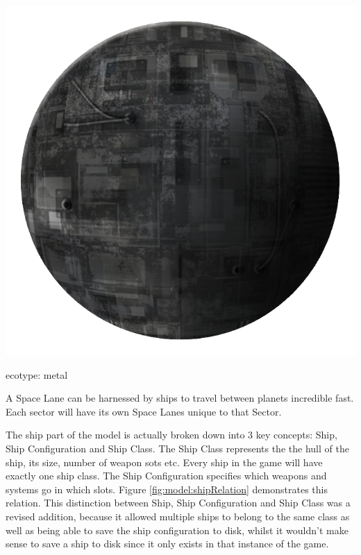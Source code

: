 \begin{marginfigure}
	\includegraphics{res/planets/metal-planet.png}
	\caption{ecotype: metal}
	\label{fig:model:metalPlanet}
\end{marginfigure}


A Space Lane can be harnessed by ships to travel between planets incredible fast.
Each sector will have its own Space Lanes unique to that Sector.

The ship part of the model is actually broken down into 3 key concepts: Ship, Ship Configuration and Ship Class.
The Ship Class represents the the hull of the ship, its size, number of weapon sots etc. Every ship in the game will have exactly one ship class. The Ship Configuration specifies which weapons and systems go in which slots. Figure \ref{fig:model:shipRelation} demonstrates this relation.
This distinction between Ship, Ship Configuration and Ship Class was a revised addition, because it allowed multiple ships to belong to the same class as well as being able to save the ship configuration to disk, whilst it wouldn't make sense to save a ship to disk since it only exists in that instance of the game.

